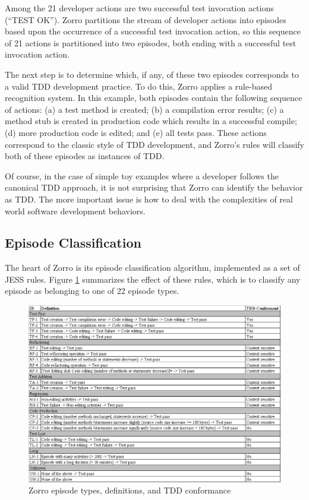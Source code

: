 \documentclass[smallextended]{svjour3}     %
\begin{document}
Among the 21 developer actions are two successful test invocation actions
(``TEST OK'').  Zorro partitions the stream of developer actions into
episodes based upon the occurrence of a successful test invocation action,
so this sequence of 21 actions is partitioned into two episodes, both
ending with a successful test invocation action.

The next step is to determine which, if any, of these two episodes
corresponds to a valid TDD development practice.  To do this, Zorro applies
a rule-based recognition system.  In this example, both episodes contain
the following sequence of actions: (a) a test method is created; (b) a
compilation error results; (c) a method stub is created in production code
which results in a successful compile; (d) more production code is edited;
and (e) all tests pass.  These actions correspond to the classic style of
TDD development, and Zorro's rules will classify both of these episodes as
instances of TDD.

Of course, in the case of simple toy examples where a developer follows the
canonical TDD approach, it is not surprising that Zorro can identify the
behavior as TDD.  The more important issue is how to deal with the
complexities of real world software development behaviors. 

\subsection{Episode Classification}

The heart of Zorro is its episode classification algorithm, implemented as
a set of JESS rules.  Figure \ref{fig:Categories} summarizes the effect of these rules, which is to classify any episode as belonging to one of 22 episode types. 

\begin{figure}[th]
  \center
  \includegraphics[width=1.0\textwidth]{episode-classification.eps}
  \caption{Zorro episode types, definitions, and TDD conformance}
  \label{fig:Categories}
\end{figure} 
\end{document}
